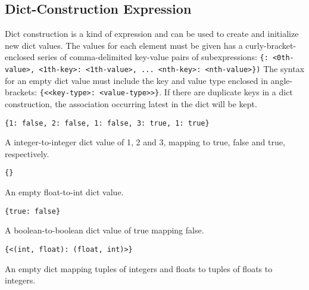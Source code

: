 
\subsection{Dict-Construction Expression}
{
	Dict construction is a kind of expression and can be
	used to create and initialize new dict values.
	The values for each element must be given has a curly-bracket-enclosed
	series of comma-delimited
	key-value pairs of
	subexpressions: \texttt{\{<0th-key>: <0th-value>, <1th-key>: <1th-value>, ... <nth-key>: <nth-value>\})}
	The syntax for an empty dict value must include the key and value
	type enclosed
	in angle-brackets: \texttt{\{<<key-type>: <value-type>>\}}.
	If there are duplicate keys in a dict construction, the
	association occurring latest in
	the dict will be kept.
	
	\begin{itemize}
	{
		\item[] \texttt{\{1: false, 2: false, 1: false, 3: true, 1: true\}}
		
			A integer-to-integer dict value of 1, 2 and 3, mapping to true,
			false and true, respectively.
		
		\item[] \texttt{\{<float: int>\}}
		
			An empty float-to-int dict value.
		
		\item[] \texttt{\{true: false\}}
		
			A boolean-to-boolean dict value of
			true mapping false.
		
		\item[] \texttt{\{<(int, float): (float, int)>\}}
		
			An empty dict mapping
			tuples of integers and floats to tuples of floats to integers.
	}
	\end{itemize}
}

